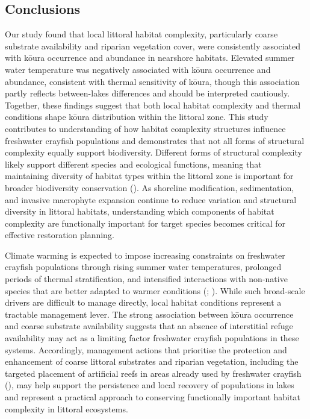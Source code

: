 \documentclass[
  letterpaper,
  DIV=11,
  numbers=noendperiod]{scrartcl}
\begin{document}
\subsection{Conclusions}\label{conclusions}

Our study found that local littoral habitat complexity, particularly
coarse substrate availability and riparian vegetation cover, were
consistently associated with kōura occurrence and abundance in nearshore
habitats. Elevated summer water temperature was negatively associated
with kōura occurrence and abundance, consistent with thermal sensitivity
of kōura, though this association partly reflects between-lakes
differences and should be interpreted cautiously. Together, these
findings suggest that both local habitat complexity and thermal
conditions shape kōura distribution within the littoral zone. This study
contributes to understanding of how habitat complexity structures
influence freshwater crayfish populations and demonstrates that not all
forms of structural complexity equally support biodiversity. Different
forms of structural complexity likely support different species and
ecological functions, meaning that maintaining diversity of habitat
types within the littoral zone is important for broader biodiversity
conservation (). As shoreline modification, sedimentation, and invasive
macrophyte expansion continue to reduce variation and structural
diversity in littoral habitats, understanding which components of
habitat complexity are functionally important for target species becomes
critical for effective restoration planning.

Climate warming is expected to impose increasing constraints on
freshwater crayfish populations through rising summer water
temperatures, prolonged periods of thermal stratification, and
intensified interactions with non-native species that are better adapted
to warmer conditions (;
). While such broad-scale
drivers are difficult to manage directly, local habitat conditions
represent a tractable management lever. The strong association between
kōura occurrence and coarse substrate availability suggests that an
absence of interstitial refuge availability may act as a limiting factor
freshwater crayfish populations in these systems. Accordingly,
management actions that prioritise the protection and enhancement of
coarse littoral substrates and riparian vegetation, including the
targeted placement of artificial reefs in areas already used by
freshwater crayfish (), may help support the persistence and local recovery of
populations in lakes and represent a practical approach to conserving
functionally important habitat complexity in littoral ecosystems.
\end{document}
